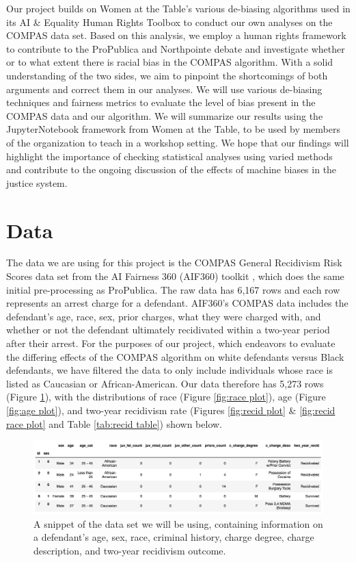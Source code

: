 \documentclass[water,article,submit,moreauthors,pdftex]{mdpi}
\begin{document}
Our project builds on Women at the Table's various de-biasing algorithms
used in its AI \& Equality Human Rights Toolbox to conduct our own
analyses on the COMPAS data set. Based on this analysis, we employ a
human rights framework to contribute to the ProPublica and Northpointe
debate and investigate whether or to what extent there is racial bias in
the COMPAS algorithm. With a solid understanding of the two sides, we
aim to pinpoint the shortcomings of both arguments and correct them in
our analyses. We will use various de-biasing techniques and fairness
metrics to evaluate the level of bias present in the COMPAS data and our
algorithm. We will summarize our results using the JupyterNotebook
framework from Women at the Table, to be used by members of the
organization to teach in a workshop setting. We hope that our findings
will highlight the importance of checking statistical analyses using
varied methods and contribute to the ongoing discussion of the effects
of machine biases in the justice system.

\hypertarget{data}{%
\section{Data}\label{data}}

The data we are using for this project is the COMPAS General Recidivism
Risk Scores data set from the AI Fairness 360 (AIF360) toolkit
\citep{aif360-oct-2018}, which does the same initial pre-processing as
ProPublica. The raw data has 6,167 rows and each row represents an
arrest charge for a defendant. AIF360's COMPAS data includes the
defendant's age, race, sex, prior charges, what they were charged with,
and whether or not the defendant ultimately recidivated within a
two-year period after their arrest. For the purposes of our project,
which endeavors to evaluate the differing effects of the COMPAS
algorithm on white defendants versus Black defendants, we have filtered
the data to only include individuals whose race is listed as Caucasian
or African-American. Our data therefore has 5,273 rows (Figure
\ref{fig:table snip}), with the distributions of race (Figure
\ref{fig:race plot}), age (Figure \ref{fig:age plot}), and two-year
recidivism rate (Figures \ref{fig:recid plot} \&
\ref{fig:recid race plot} and Table \ref{tab:recid table}) shown below.

\begin{figure}

{\centering \includegraphics[width=1\linewidth]{../images/table_snippet} 

}

\caption{A snippet of the data set we will be using, containing information on a defendant's age, sex, race, criminal history, charge degree, charge description, and two-year recidivism outcome.}\label{fig:table snip}
\end{figure}
\end{document}
